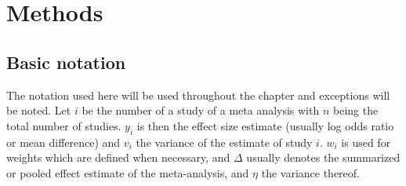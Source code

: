 \documentclass[11pt,a4paper,twoside]{book}\usepackage[]{graphicx}\usepackage[]{color}
\begin{document}
% 
% 






\chapter{Methods}

\section{Basic notation}
The notation used here will be used throughout the chapter and exceptions will be noted. Let $i$ be the number of a study of a meta analysis with $n$ being the total number of studies. $y_{i}$ is then the effect size estimate (usually log odds ratio or mean difference) and $v_{i}$ the variance of the estimate of study $i$. $w_{i}$ is used for weights which are defined when necessary, and $\Delta$ usually denotes the summarized or pooled effect estimate of the meta-analysis, and $\eta$ the variance thereof.
\end{document}
